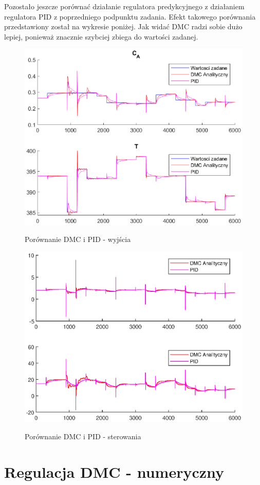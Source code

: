 \newpage
Pozostało jeszcze porównać działanie regulatora predykcyjnego z działaniem regulatora PID z poprzedniego podpunktu zadania. Efekt takowego porównania przedstawiony został na wykresie poniżej. Jak widać DMC radzi sobie dużo lepiej, ponieważ znacznie szybciej zbiega do wartości zadanej.
\begin{figure}[h!]
	\centering
	\includegraphics[width=.7\linewidth]{img/dmcvspid.eps}
	\label{ch2:dmcvspid}
	\caption{Porównanie DMC i PID - wyjścia}
\end{figure}
\begin{figure}[h!]
\centering
\includegraphics[width=.7\linewidth]{img/dmcvspidster}
\label{ch2:dmcvspidster}
\caption{Porównanie DMC i PID - sterowania}
\end{figure}



\section{Regulacja DMC - numeryczny}

